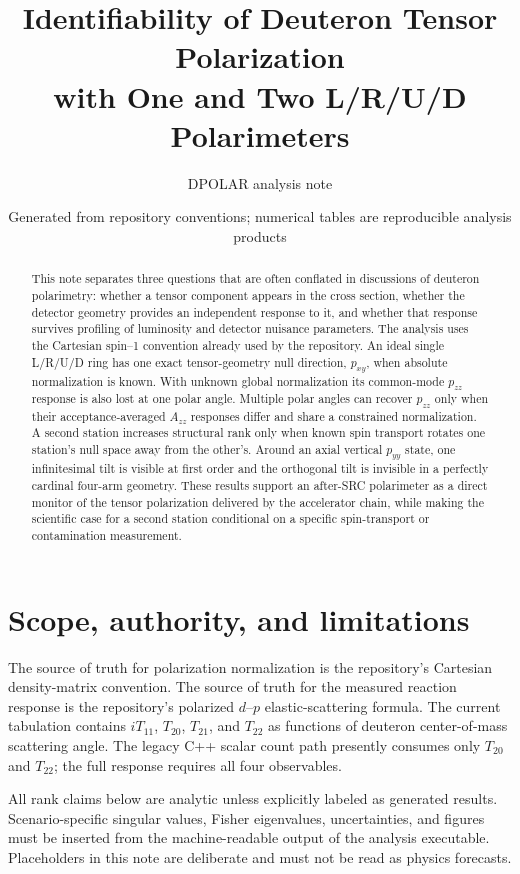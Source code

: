 \documentclass[11pt,a4paper]{article}
\title{Identifiability of Deuteron Tensor Polarization\\
with One and Two L/R/U/D Polarimeters}
\author{DPOLAR analysis note}
\date{Generated from repository conventions; numerical tables are reproducible analysis products}
\begin{document}
\maketitle

\begin{abstract}
This note separates three questions that are often conflated in discussions of
deuteron polarimetry: whether a tensor component appears in the cross section,
whether the detector geometry provides an independent response to it, and
whether that response survives profiling of luminosity and detector nuisance
parameters.  The analysis uses the Cartesian spin--1 convention already used
by the repository.  An ideal single L/R/U/D ring has one exact tensor-geometry
null direction, $p_{xy}$, when absolute normalization is known.  With unknown
global normalization its common-mode $p_{zz}$ response is also lost at one
polar angle.  Multiple polar angles can recover $p_{zz}$ only when their
acceptance-averaged $A_{zz}$ responses differ and share a constrained
normalization.  A second station increases structural rank only when known spin
transport rotates one station's null space away from the other's.  Around an
axial vertical $p_{yy}$ state, one infinitesimal tilt is visible at first order
and the orthogonal tilt is invisible in a perfectly cardinal four-arm geometry.
These results support an after-SRC polarimeter as a direct monitor of the tensor
polarization delivered by the accelerator chain, while making the scientific
case for a second station conditional on a specific spin-transport or
contamination measurement.
\end{abstract}

\section{Scope, authority, and limitations}

The source of truth for polarization normalization is the repository's
Cartesian density-matrix convention.  The source of truth for the measured
reaction response is the repository's polarized $d$--$p$ elastic-scattering
formula.  The current tabulation contains $iT_{11}$, $T_{20}$, $T_{21}$, and
$T_{22}$ as functions of deuteron center-of-mass scattering angle.  The legacy
C++ scalar count path presently consumes only $T_{20}$ and $T_{22}$; the full
response requires all four observables.

All rank claims below are analytic unless explicitly labeled as generated
results.  Scenario-specific singular values, Fisher eigenvalues, uncertainties,
and figures must be inserted from the machine-readable output of the analysis
executable.  Placeholders in this note are deliberate and must not be read as
physics forecasts.
\end{document}
